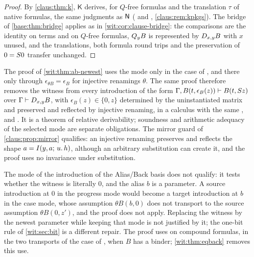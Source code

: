 \begin{proof}
By \cref{claus:thm:k}, $\mathsf{K}$ derives, for $Q$-free formulas and the
translation $\tau$ of native formulas, the same judgments as $\mathsf{N}$
( and ,
\cref{claus:rem:kpkgs}).  The bridge of \cref{base:thm:bridge} applies as in
\cref{wit:cor:clause-bridge}: the comparisons are the identity on terms and
on $Q$-free formulas, $Q_{y}B$ is represented by $D_{x,y}B$ with $x$ unused,
and the translations, both formula round trips and the preservation of
$0=S 0$ transfer unchanged.
\end{proof}

\begin{remark}
\label{wit:rem:ab-mode}
The proof of \cref{wit:thm:ab-newest} uses the mode only in the case of
, and there only through $\epsilon_{\theta B}=\epsilon_B$
for injective renamings $\theta$.  The same proof therefore removes the
witness from every introduction of the form
$\Gamma,B(t,\epsilon_B(z))\vdash B(t,S z)$ over $\Gamma\vdash D_{x,y}B$,
with $\epsilon_B(z)\in\{0,z\}$ determined by the uninstantiated matrix and
preserved and reflected by injective renaming, in a calculus with the
same ,  and .  It is a theorem
of relative derivability; soundness and arithmetic adequacy of the selected
mode are separate obligations.  The mirror guard of
\cref{claus:prop:mirror} qualifies: an injective renaming preserves and
reflects the shape $a=I(y,a;\,u.\,h)$, although an arbitrary substitution
can create it, and the proof uses no invariance under substitution.

The mode of the introduction of the Alias/Back basis does not qualify: it
tests whether the witness is literally $0$, and the alias $b$ is a
parameter.  A source introduction at $0$ in the progress mode would become
a target introduction at $b$ in the case mode, whose assumption
$\theta B(b,0)$ does not transport to the source assumption
$\theta B(0,z')$, and the proof does not apply.  Replacing the witness by
the newest parameter while keeping that mode is not justified by it; the
one-bit rule of \cref{wit:sec:bit} is a different repair.  The proof uses
 on compound formulas, in the two transports of the case of
, when $B$ has a binder; \cref{wit:thm:eqback} removes this
use.
\end{remark}

